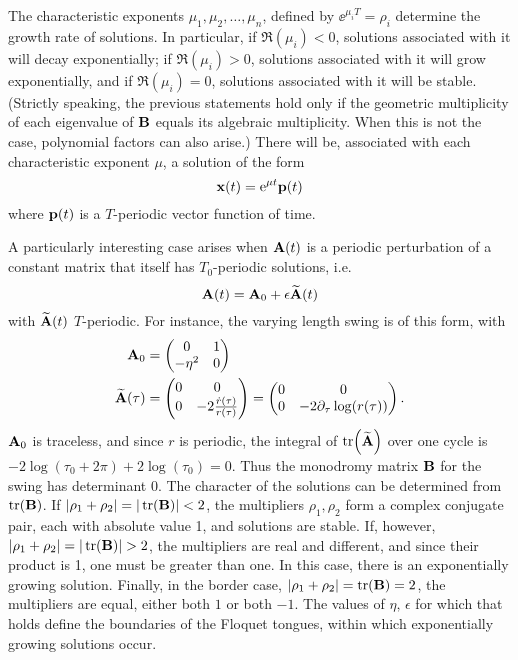 The characteristic exponents  
$\mu_{1},\mu_{2},{\ldots},\mu_{n}$, defined by $\ee^{\mu_{i}T}=\rho_{i}$ determine the
growth rate of solutions. In particular, if $\Re(\mu_{i})<0$,
solutions associated with it will decay exponentially; if
$\Re(\mu_{i})>0$, solutions associated with it will grow
exponentially, and if $\Re(\mu_{i})=0$, solutions 
associated with it will be stable. (Strictly speaking, the previous
statements hold only if the geometric multiplicity of each eigenvalue
of $\vb{B}$ equals its algebraic multiplicity. When this is not the case,
polynomial factors can also arise.) There will be, associated with
each characteristic exponent $\mu$, a solution of the form 
\begin{equation}
\vb{x}(t)=\mathrm{e}^{\mu t}\vb{p}(t)
\end{equation}
where $\vb{p}(t)$ is a $T$-periodic vector function of time. 

A particularly interesting case arises when $\vb{A}(t)$ is a periodic
perturbation of a constant matrix that itself has 
${T}_{0}$-periodic solutions, i.e.
\begin{equation}
\vb{A}(t)={\vb{A}}_{0}+\epsilon \widetilde{{\vb{A}}}(t)
\end{equation}
with $\widetilde{{\vb{A}}}(t)$ $T${}-periodic. For instance, the varying
length swing is of this form, with
\begin{equation}
\begin{aligned}
\vb{A}_0&=
\begin{pmatrix}0&1\\-{\eta }^{2}&0\end{pmatrix}
\\
\widetilde{{\vb{A}}}(\tau)&=
\begin{pmatrix}0&0\\
0&-2\frac{\dot{{r}}(\tau)}{r(\tau)}
\end{pmatrix}
=
\begin{pmatrix}0&0\\
0&-2\partial_{\tau}\log(r(\tau))
\end{pmatrix}.
\end{aligned}
\end{equation}
${\vb{A}}_{0}$ is traceless, and since $r$ is periodic, the integral of 
$\tr(\widetilde{{\vb{A}}})$ over one cycle is  
$-2\log({\tau}_{0}+2\pi )+2\log({\tau }_{0})=0$. Thus the
monodromy matrix $\vb{B}$ for the swing has determinant 0. The character
of the solutions can be determined from $\tr(\vb{B})$.
If $\abs{\rho_{1}+\rho_{2}}=|\tr(\vb{B})|<2$, the multipliers  
$\rho_{1},\rho_{2}$ form a complex conjugate pair, each with absolute
value 1, and solutions are stable. If, however,
$\abs{\rho_{1}+\rho_{2}}=|\tr(\vb{B})|>2$, the multipliers
are real and different, and since their product is 1, one must be
greater than one. In this case, there is an exponentially growing
solution. Finally, in the border case,
$|\rho_{1}+\rho_{2}|=\tr(\vb{B})=2$, the multipliers are equal, either
both $1$ or both $-1$. The values of $\eta,\,\epsilon $ for 
which that holds define the boundaries of the Floquet tongues, within
which exponentially growing solutions occur. 


